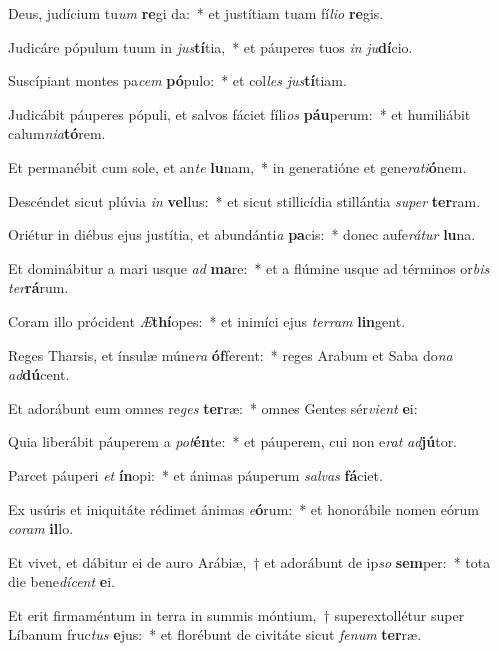 \item Deus, judícium tu\textit{um} \textbf{re}gi da:~* et justítiam tuam fí\textit{li}\textit{o} \textbf{re}gis.
\item Judicáre pópulum tuum in \textit{jus}\textbf{tí}tia,~* et páuperes tuos \textit{in} \textit{ju}\textbf{dí}cio.
\item Suscípiant montes pa\textit{cem} \textbf{pó}pulo:~* et col\textit{les} \textit{jus}\textbf{tí}tiam.
\item Judicábit páuperes pópuli, et salvos fáciet fíli\textit{os} \textbf{páu}perum:~* et humiliábit calum\textit{ni}\textit{a}\textbf{tó}rem.
\item Et permanébit cum sole, et an\textit{te} \textbf{lu}nam,~* in generatióne et gene\textit{ra}\textit{ti}\textbf{ó}nem.
\item Descéndet sicut plúvia \textit{in} \textbf{vel}lus:~* et sicut stillicídia stillántia \textit{su}\textit{per} \textbf{ter}ram.
\item Oriétur in diébus ejus justítia, et abundánti\textit{a} \textbf{pa}cis:~* donec aufe\textit{rá}\textit{tur} \textbf{lu}na.
\item Et dominábitur a mari usque \textit{ad} \textbf{ma}re:~* et a flúmine usque ad términos or\textit{bis} \textit{ter}\textbf{rá}rum.
\item Coram illo prócident \textit{Æ}\textbf{thí}opes:~* et inimíci ejus \textit{ter}\textit{ram} \textbf{lin}gent.
\item Reges Tharsis, et ínsulæ múne\textit{ra} \textbf{óf}ferent:~* reges Arabum et Saba do\textit{na} \textit{ad}\textbf{dú}cent.
\item Et adorábunt eum omnes re\textit{ges} \textbf{ter}ræ:~* omnes Gentes sér\textit{vi}\textit{ent} \textbf{e}i:
\item Quia liberábit páuperem a \textit{pot}\textbf{én}te:~* et páuperem, cui non e\textit{rat} \textit{ad}\textbf{jú}tor.
\item Parcet páuperi \textit{et} \textbf{ín}opi:~* et ánimas páuperum \textit{sal}\textit{vas} \textbf{fá}ciet.
\item Ex usúris et iniquitáte rédimet ánimas \textit{e}\textbf{ó}rum:~* et honorábile nomen eórum \textit{co}\textit{ram} \textbf{il}lo.
\item Et vivet, et dábitur ei de auro Arábiæ,~† et adorábunt de ip\textit{so} \textbf{sem}per:~* tota die bene\textit{dí}\textit{cent} \textbf{e}i.
\item Et erit firmaméntum in terra in summis móntium,~† superextollétur super Líbanum fruc\textit{tus} \textbf{e}jus:~* et florébunt de civitáte sicut \textit{fe}\textit{num} \textbf{ter}ræ.
